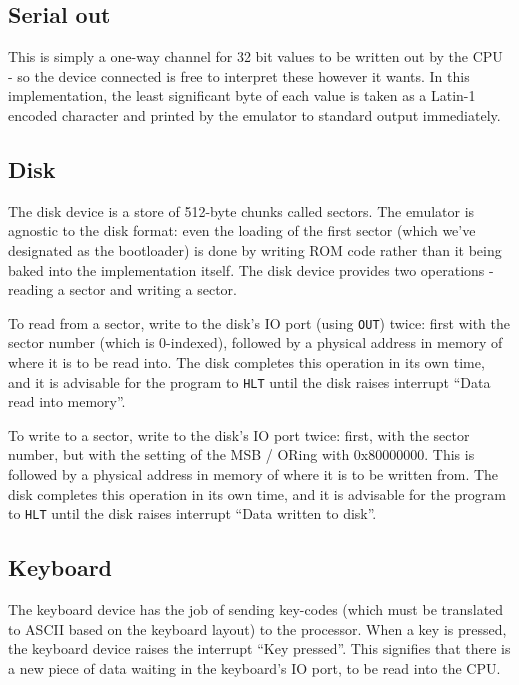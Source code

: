 \documentclass[12pt,a4paper]{report}
\begin{document}
\subsection*{Serial out}

This is simply a one-way channel for 32 bit values to be written out by the CPU - so the device connected is free to interpret these however it wants. In this implementation, the least significant byte of each value is taken as a Latin-1 encoded character and printed by the emulator to standard output immediately.

\subsection*{Disk}

The disk device is a store of 512-byte chunks called sectors. The emulator is agnostic to the disk format: even the loading of the first sector (which we've designated as the bootloader) is done by writing ROM code rather than it being baked into the implementation itself. The disk device provides two operations - reading a sector and writing a sector.

To read from a sector, write to the disk's IO port (using \texttt{OUT}) twice: first with the sector number (which is 0-indexed), followed by a physical address in memory of where it is to be read into. The disk completes this operation in its own time, and it is advisable for the program to \texttt{HLT} until the disk raises interrupt ``Data read into memory''.

To write to a sector, write to the disk's IO port twice: first, with the sector number, but with the setting of the MSB / ORing with 0x80000000. This is followed by a physical address in memory of where it is to be written from. The disk completes this operation in its own time, and it is advisable for the program to \texttt{HLT} until the disk raises interrupt ``Data written to disk''.

\subsection*{Keyboard}

The keyboard device has the job of sending key-codes (which must be translated to ASCII based on the keyboard layout) to the processor. When a key is pressed, the keyboard device raises the interrupt ``Key pressed''. This signifies that there is a new piece of data waiting in the keyboard's IO port, to be read into the CPU.
\end{document}

